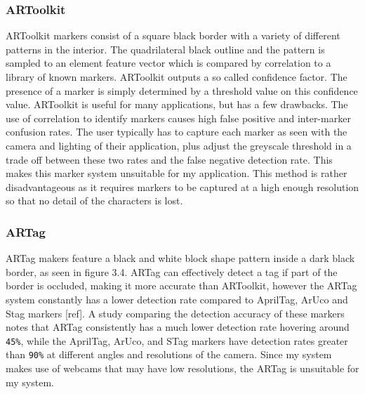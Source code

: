 \documentclass[oneside,%
                    author={Malak Hajji},
                    degree={BSc},
                    title={Designing An Accessible Computational Toolkit For Students},
                  subtitle={With Mixed Visual Abilities}]{dissertation}
\begin{document}
\subsubsection{ARToolkit}
ARToolkit markers consist of a square black border with a variety of different patterns in the interior. The quadrilateral black outline and the pattern is sampled to an element feature vector which is compared by correlation to a library of known markers. ARToolkit outputs a so called confidence factor. The presence of a marker is simply determined by a threshold value on this confidence value.
ARToolkit is useful for many applications, but has a few drawbacks. The use of correlation to identify markers causes high false positive and inter-marker confusion rates. The user typically has to capture each marker as seen with the camera and lighting of their application, plus adjust the greyscale threshold in a trade off between these two rates and the false negative detection rate. This makes this marker system unsuitable for my application. This method is rather disadvantageous as it requires markers to be captured at a high enough resolution so that no detail of the characters is lost. 

\subsubsection{ARTag}
ARTag makers feature a black and white block shape pattern inside a dark black border, as seen in figure 3.4. ARTag can  effectively detect a tag if part of the border is occluded, making it more accurate than ARToolkit, however the ARTag system constantly has a lower detection rate compared to AprilTag, ArUco and Stag markers [ref]. A study comparing the detection accuracy of these markers notes that ARTag consistently has a much lower detection rate hovering around \texttt{45\%}, while the AprilTag, ArUco, and STag markers have detection rates greater than \texttt{90\%} at different angles and resolutions of the camera. Since my system makes use of webcams that may have low resolutions, the ARTag is unsuitable for my system.
\end{document}
